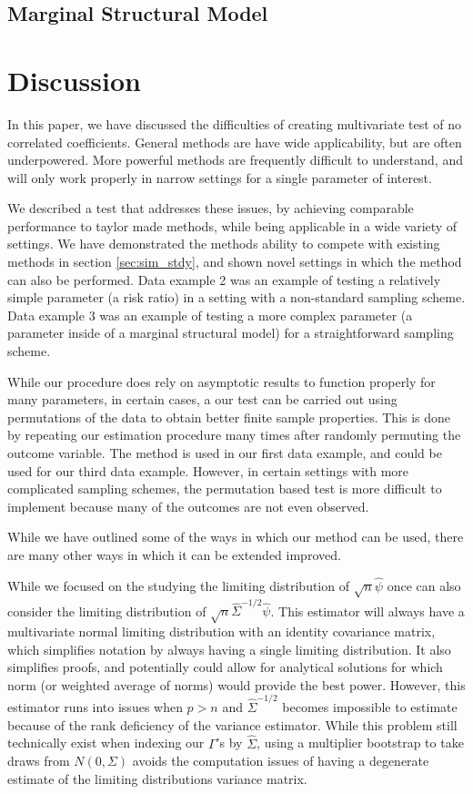 \documentclass{article}
\begin{document}
\subsection*{Marginal Structural Model}

\section{Discussion}
\label{sec:discuss}


In this paper, we have discussed the difficulties of creating multivariate test of no correlated coefficients.  General methods are have wide applicability, but are often underpowered.  More powerful methods are frequently difficult to understand, and will only work properly in narrow settings for a single parameter of interest.  

We described a test that addresses these issues, by achieving comparable performance to taylor made methods, while being applicable in a wide variety of settings.  We have demonstrated the methods ability to compete with existing methods in section \ref{sec:sim_stdy}, and shown novel settings in which the method can also be performed.  Data example 2 was an example of testing a relatively simple parameter (a risk ratio) in a setting with a non-standard sampling scheme.  Data example 3 was an example of testing a more complex parameter (a parameter inside of a marginal structural model) for a straightforward sampling scheme.  

While our procedure does rely on asymptotic results to function properly for many parameters, in certain cases, a our test can be carried out using permutations of the data to obtain better finite sample properties.  This is done by repeating our estimation procedure many times after randomly permuting the outcome variable.  The method is used in our first data example, and could be used for our third data example.  However, in certain settings with more complicated sampling schemes, the permutation based test is more difficult to implement because many of the outcomes are not even observed.

While we have outlined some of the ways in which our method can be used, there are many other ways in which it can be extended improved. 

While we focused on the studying the limiting distribution of $\sqrt{n}\hat{\psi}$ once can also consider the limiting distribution of $\sqrt{n}\hat{\Sigma}^{-1/2}\hat{\psi}$.  This estimator will always have a multivariate normal limiting distribution with an identity covariance matrix, which simplifies notation by always having a single limiting distribution.  It also simplifies proofs, and potentially could allow for analytical solutions for which norm (or weighted average of norms) would provide the best power.  However, this estimator runs into issues when $p > n$ and $\hat{\Sigma}^{-1/2}$ becomes impossible to estimate because of the rank deficiency of the variance estimator.  While this problem still technically exist when indexing our $\Gamma$'s by $\hat{\Sigma}$, using a multiplier bootstrap to take draws from $N(0, \Sigma)$ avoids the computation issues of having a degenerate estimate of the limiting distributions variance matrix.
\end{document}
